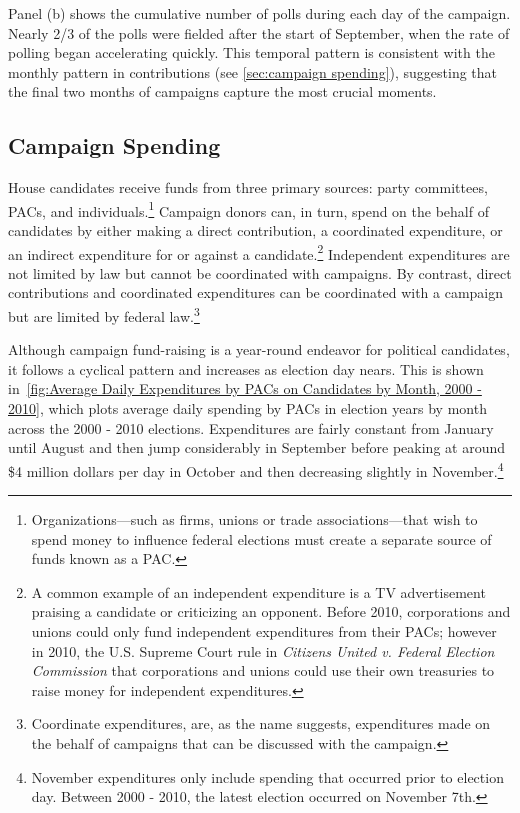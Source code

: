 \documentclass[12pt,final,fleqn]{article}
\theoremstyle{plain}
\begin{document}
Panel (b) shows the cumulative number of polls during each day of the campaign. Nearly 2/3 of the polls were fielded after the start of September, when the rate of polling began accelerating quickly. This temporal pattern is consistent with the monthly pattern in contributions (see \autoref{sec:campaign spending}), suggesting that the final two months of campaigns capture the most crucial moments.

\subsection{Campaign Spending} \label{sec:campaign spending}
House candidates receive funds from three primary sources: party committees, PACs, and individuals.\footnote{Organizations---such as firms, unions or trade associations---that wish to spend money to influence federal elections must create a separate source of funds known as a PAC.} Campaign donors can, in turn, spend on the behalf of candidates by either making a direct contribution, a coordinated expenditure, or an indirect expenditure for or against a candidate.\footnote{A common example of an independent expenditure is a TV advertisement praising a candidate or criticizing an opponent. Before 2010, corporations and unions could only fund independent expenditures from their PACs; however in 2010, the U.S. Supreme Court rule in \emph{Citizens United v. Federal Election Commission} that corporations and unions could use their own treasuries to raise money for independent expenditures.} Independent expenditures are not limited by law but cannot be coordinated with campaigns. By contrast, direct contributions and coordinated expenditures can be coordinated with a campaign but are limited by federal law.\footnote{Coordinate expenditures, are, as the name suggests, expenditures made on the behalf of campaigns that can be discussed with the campaign.}

Although campaign fund-raising is a year-round endeavor for political candidates, it follows a cyclical pattern and increases as election day nears. This is shown in~\autoref{fig:Average Daily Expenditures by PACs on Candidates by Month, 2000 - 2010}, which plots average daily spending by PACs in election years by month across the 2000 - 2010 elections. Expenditures are fairly constant from January until August and then jump considerably in September before peaking at around \$4 million dollars per day in October and then decreasing slightly in November.\footnote{November expenditures only include spending that occurred prior to election day. Between 2000 - 2010, the latest election occurred on November 7th.} 
\end{document}
